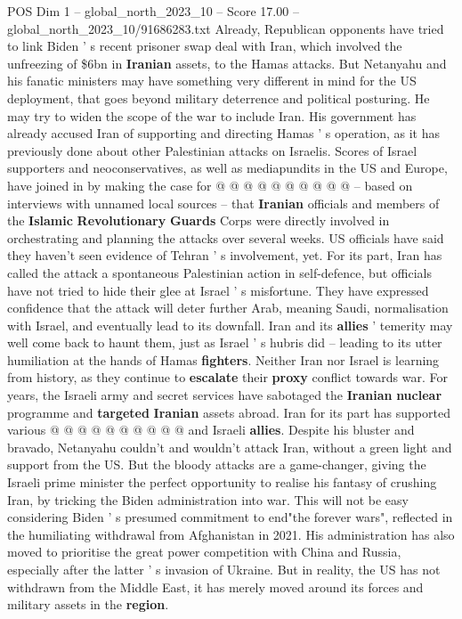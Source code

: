\begin{textsample}{POS Dim 1 – global\_north\_2023\_10 – Score 17.00 – global\_north\_2023\_10/91686283.txt}
Already, Republican opponents have tried to link Biden ' s recent prisoner swap deal with Iran, which involved the unfreezing of \$6bn in \textbf{Iranian} assets, to the Hamas attacks.
But Netanyahu and his fanatic ministers may have something very different in mind for the US deployment, that goes beyond military deterrence and political posturing.
He may try to widen the scope of the war to include Iran.
His government has already accused Iran of supporting and directing Hamas ' s operation, as it has previously done about other Palestinian attacks on Israelis.
Scores of Israel supporters and neoconservatives, as well as mediapundits in the US and Europe, have joined in by making the case for @ @ @ @ @ @ @ @ @ @ -- based on interviews with unnamed local sources -- that \textbf{Iranian} officials and members of the \textbf{Islamic} \textbf{Revolutionary} \textbf{Guards} Corps were directly involved in orchestrating and planning the attacks over several weeks.
US officials have said they haven't seen evidence of Tehran ' s involvement, yet.
For its part, Iran has called the attack a spontaneous Palestinian action in self-defence, but officials have not tried to hide their glee at Israel ' s misfortune.
They have expressed confidence that the attack will deter further Arab, meaning Saudi, normalisation with Israel, and eventually lead to its downfall.
Iran and its \textbf{allies} ' temerity may well come back to haunt them, just as Israel ' s hubris did -- leading to its utter humiliation at the hands of Hamas \textbf{fighters}.
Neither Iran nor Israel is learning from history, as they continue to \textbf{escalate} their \textbf{proxy} conflict towards war.
For years, the Israeli army and secret services have sabotaged the \textbf{Iranian} \textbf{nuclear} programme and \textbf{targeted} \textbf{Iranian} assets abroad.
Iran for its part has supported various @ @ @ @ @ @ @ @ @ @ and Israeli \textbf{allies}.
Despite his bluster and bravado, Netanyahu couldn't and wouldn't attack Iran, without a green light and support from the US.
But the bloody attacks are a game-changer, giving the Israeli prime minister the perfect opportunity to realise his fantasy of crushing Iran, by tricking the Biden administration into war.
This will not be easy considering Biden ' s presumed commitment to end"the forever wars", reflected in the humiliating withdrawal from Afghanistan in 2021.
His administration has also moved to prioritise the great power competition with China and Russia, especially after the latter ' s invasion of Ukraine.
But in reality, the US has not withdrawn from the Middle East, it has merely moved around its forces and military assets in the \textbf{region}.

\end{textsample}
